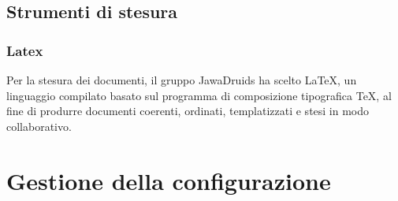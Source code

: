 \subsection{Strumenti di stesura}
\subsubsection{Latex}
Per la stesura dei documenti, il gruppo JawaDruids ha scelto \LaTeX, un linguaggio compilato basato sul programma di composizione tipografica \TeX, al fine di produrre documenti coerenti, ordinati, templatizzati e stesi in modo collaborativo.
\section{Gestione della configurazione}
